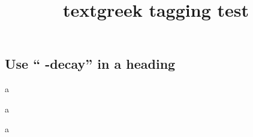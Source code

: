 \documentclass{article}
\title{textgreek tagging test}
\begin{document}
\subsection{Use \textquotedblleft\textbeta
-decay\textquotedblright {} in a heading}

a\textalpha

a\textit{\textUpsilon}

a\straightphi
\end{document}
